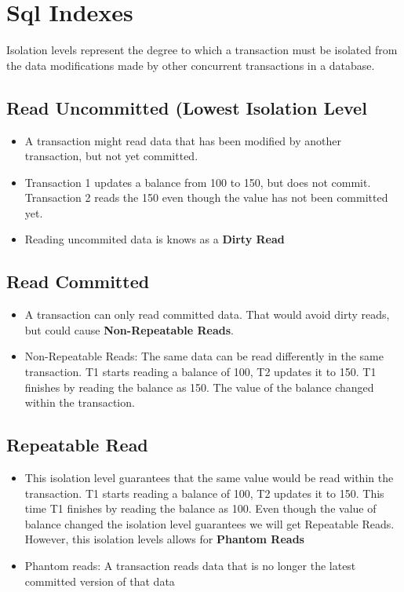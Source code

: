 \chapter*{Sql Indexes} %

Isolation levels represent the degree to which a transaction must be isolated from the data modifications made by other concurrent transactions in a database.

\section*{Read Uncommitted (Lowest Isolation Level} %
\begin{itemize}
    \item A transaction might read data that has been modified by another transaction, but not yet committed.
    \item Transaction 1 updates a balance from 100 to 150, but does not commit. Transaction 2 reads the 150 even though the value has not been committed yet.
    \item Reading uncommited data is knows as a \textbf{Dirty Read}
\end{itemize}

\section*{Read Committed}
\begin{itemize}
\item A transaction can only read committed data. That would avoid dirty reads, but could cause \textbf{Non-Repeatable Reads}.

\item Non-Repeatable Reads: The same data can be read differently in the same transaction. T1 starts reading a balance of 100, T2 updates it to 150. T1 finishes by reading the balance as 150. The value of the balance changed within the transaction.
\end{itemize}

\section*{Repeatable Read}
\begin{itemize}
\item This isolation level guarantees that the same value would be read within the transaction. T1 starts reading a balance of 100, T2 updates it to 150. This time T1 finishes by reading the balance as 100. Even though the value of balance changed the isolation level guarantees we will get Repeatable Reads. However, this isolation levels allows for \textbf{Phantom Reads}
\item Phantom reads: A transaction reads data that is no longer the latest committed version of that data
\end{itemize}


